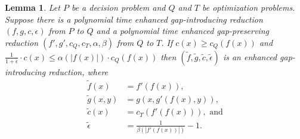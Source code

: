 \documentclass[]{article}
\theoremstyle{plain}
\newtheorem{lemma}{Lemma}
\theoremstyle{definition}
\begin{document}
\begin{lemma}\label{lem:compose}
  Let $P$ be a decision problem and $Q$ and $T$ be optimization problems.
  Suppose there is a polynomial time enhanced gap-introducing reduction $(f, g, c, \epsilon)$ from $P$ to $Q$ and a polynomial time enhanced gap-preserving reduction $(f', g', c_Q, c_T, \alpha, \beta)$ from $Q$ to $T$.
  If $c(x) \geq c_Q(f(x))$ and $\frac{1}{1 + \epsilon} \cdot c(x) \leq \alpha(|f(x)|) \cdot c_Q(f(x))$ then $(\tilde{f}, \tilde{g}, \tilde{c}, \tilde{\epsilon})$ is an enhanced gap-introducing reduction, where
  \begin{align*}
    \tilde{f}(x) & = f'(f(x)), \\
    \tilde{g}(x, y) & = g(x, g'(f(x), y)), \\
    \tilde{c}(x) & = c_T(f'(f(x))), \text{ and} \\
    \tilde{\epsilon} & = \frac{1}{\beta(|f'(f(x))|)} - 1.
  \end{align*}
\end{lemma}
\end{document}
